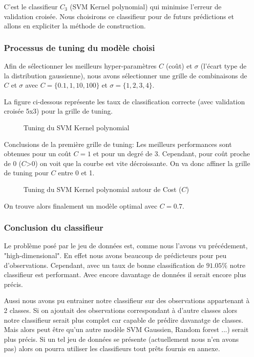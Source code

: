 \documentclass{article}
\begin{document}
C'est le classifieur $C_{3}$ (SVM Kernel polynomial) qui minimise l'erreur de validation croisée.
Nous choisirons ce classifieur pour de futurs prédictions et allons en expliciter la méthode de construction.

\subsubsection{Processus de tuning du modèle choisi}

Afin de sélectionner les meilleurs hyper-paramètres $C$ (coût) et $\sigma$ (l'écart type de la distribution gaussienne), nous avons sélectionner une grille de combinaisons de $C$ et $\sigma$ avec $C=\{  0.1, 1, 10, 100 \}$ et $\sigma=\{1,2,3,4\}$.

La figure ci-dessous représente les taux de classification correcte (avec validation croisée 5x3) pour la grille de tuning.

\begin{figure}[H]
  \centering{}
 \captionsetup{justification=centering}
    \caption{Tuning du SVM Kernel polynomial}
\end{figure}


Conclusions de la première grille de tuning:
Les meilleurs performances sont obtenues pour un coût $C=1$ et pour un degré de 3. Cependant, pour coût proche de 0 ($C$>0) on voit que la courbe est vite décroissante. On va donc affiner la grille de tuning pour $C$ entre 0 et 1.

\begin{figure}[H]
  \centering{}
 \captionsetup{justification=centering}
    \caption{Tuning du SVM Kernel polynomial autour de Cost ($C$)}
\end{figure}

On trouve alors finalement un modèle optimal avec $C=0.7$.

\subsubsection{Conclusion du classifieur}

Le problème posé par le jeu de données est, comme nous l'avons vu précédement, "high-dimensional". En effet nous avons beaucoup de prédicteurs pour peu d'observations. Cependant, avec un taux de bonne classification de $91.05\%$ notre classifieur est performant. Avec encore davantage de données il serait encore plus précis.

Aussi nous avons pu entrainer notre classifieur sur des observations appartenant à 2 classes. Si on ajoutait des observations correspondant à d'autre classes alors notre classifieur serait plus complet car capable de prédire davanatge de classes. Mais alors peut être qu'un autre modèle SVM Gaussien, Random forest ...) serait plus précis.
Si un tel jeu de données se présente (actuellement nous n'en avons pas) alors on pourra utiliser les classifieurs tout prêts fournis en annexe.
\end{document}
